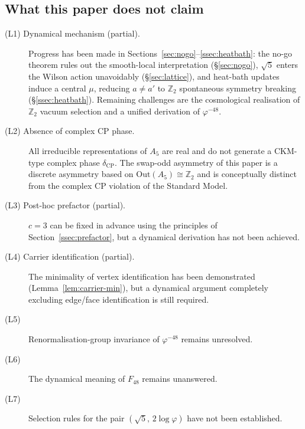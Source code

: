 \documentclass[sn-mathphys-num,Numbered]{sn-jnl}
\theoremstyle{thmstyleone}
\theoremstyle{thmstylethree}
\theoremstyle{thmstyletwo}
\begin{document}
\subsection{What this paper does not claim}
\label{ssec:limitations}

\begin{description}
  \item[(L1) Dynamical mechanism (partial).]
    Progress has been made in
    Sections~\ref{sec:nogo}--\ref{ssec:heatbath}: the no-go theorem
    rules out the smooth-local interpretation (\S\ref{sec:nogo}),
    $\sqrt{5}$ enters the Wilson action unavoidably (\S\ref{sec:lattice}),
    and heat-bath updates induce a central $\mu$, reducing $a\neq a'$ to
    $\mathbb{Z}_2$ spontaneous symmetry breaking (\S\ref{ssec:heatbath}).
    Remaining challenges are the cosmological realisation of $\mathbb{Z}_2$
    vacuum selection and a unified derivation of $\varphi^{-48}$.

  \item[(L2) Absence of complex CP phase.]
    All irreducible representations of $A_5$ are real and do not generate
    a CKM-type complex phase $\delta_{\mathrm{CP}}$.  The swap-odd
    asymmetry of this paper is a discrete asymmetry based on
    $\mathrm{Out}(A_5)\cong\mathbb{Z}_2$ and is conceptually distinct
    from the complex CP violation of the Standard Model.

  \item[(L3) Post-hoc prefactor (partial).]
    $c=3$ can be fixed in advance using the principles of
    Section~\ref{ssec:prefactor}, but a dynamical derivation has not
    been achieved.

  \item[(L4) Carrier identification (partial).]
    The minimality of vertex identification has been demonstrated
    (Lemma~\ref{lem:carrier-min}), but a dynamical argument completely
    excluding edge/face identification is still required.

  \item[(L5)] Renormalisation-group invariance of $\varphi^{-48}$
    remains unresolved.

  \item[(L6)] The dynamical meaning of $F_{48}$ remains unanswered.

  \item[(L7)] Selection rules for the pair $(\sqrt{5},\,2\log\varphi)$
    have not been established.
\end{description}
\end{document}
